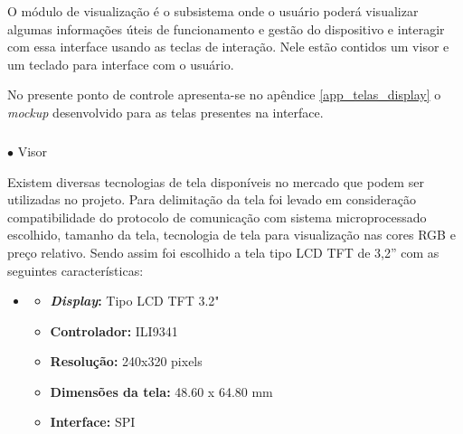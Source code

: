     O módulo de visualização é o subsistema onde o usuário poderá visualizar algumas informações úteis de funcionamento e gestão do dispositivo e interagir com essa interface usando as teclas de interação. Nele estão contidos um visor e um teclado para interface com o usuário.
    
    No presente ponto de controle apresenta-se no apêndice \ref{app_telas_display}  o \textit{mockup} desenvolvido para as telas presentes na interface.
    \newpage
        \subparagraph*{}$\bullet$ Visor \hfill
        
        Existem diversas tecnologias de tela disponíveis no mercado que podem ser utilizadas no projeto. Para delimitação da tela foi levado em consideração compatibilidade do protocolo de comunicação com sistema microprocessado escolhido, tamanho da tela, tecnologia de tela para visualização nas cores RGB e preço relativo. Sendo assim foi escolhido a tela tipo LCD TFT de 3,2” com as seguintes características:
        
        \vspace{-0.2cm}
        \begin{itemize}
            \item[ ] 
            \begin{itemize}
            \item \textbf{\textit{Display}:} Tipo LCD TFT 3.2" 
            \item \textbf{Controlador:} ILI9341
            \item \textbf{Resolução:} 240x320 pixels
            \item \textbf{Dimensões da tela:} 48.60 x 64.80 mm
            \item \textbf{Interface:} SPI
            \end{itemize}
        \end{itemize}
        
        
